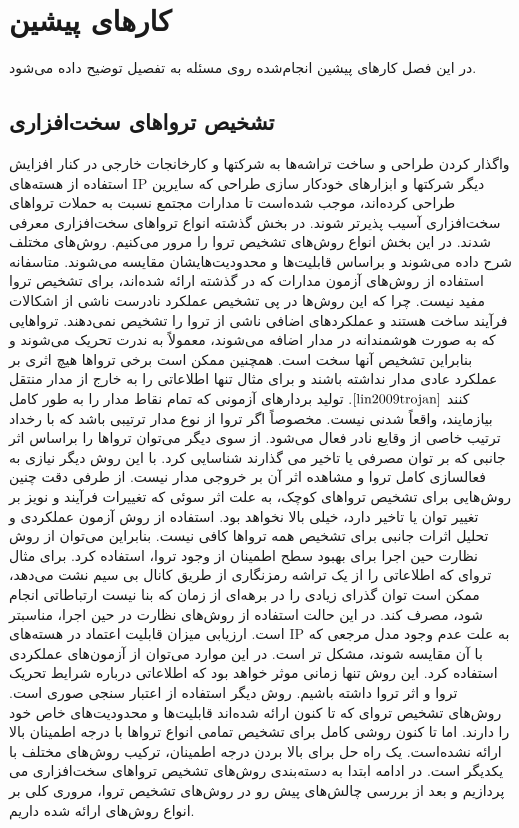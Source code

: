 \chapter{کارهای پیشین}
در این فصل کارهای پیشین انجام‌شده روی مسئله به تفصیل توضیح داده می‌شود.
\section{تشخیص تروا‌های سخت‌افزاری}
واگذار کردن طراحی و ساخت تراشه‌ها به شرکتها و کارخانجات خارجی در کنار افزایش استفاده از هسته‌های IP دیگر شرکتها و ابزارهای خودکار سازی طراحی که سایرین طراحی کرده‌اند، موجب شده‌است تا مدارات مجتمع نسبت به حملات تروا‌های سخت‌افزاری آسیب پذیرتر شوند. در بخش گذشته انواع تروا‌های سخت‌افزاری معرفی شدند. در این بخش انواع روش‌های تشخیص تروا را مرور می‌کنیم. روش‌های مختلف شرح داده می‌شوند و براساس قابلیت‌ها و محدودیت‌هایشان مقایسه می‌شوند. متاسفانه استفاده از روش‌های آزمون مدارات که در گذشته ارائه شده‌اند، برای تشخیص تروا مفید نیست. چرا که این روش‌ها در پی تشخیص عملکرد نادرست ناشی از اشکالات فرآیند ساخت هستند و عملکردهای اضافی ناشی از تروا را تشخیص نمی‌دهند. تروا‌هایی که به صورت هوشمندانه در مدار اضافه می‌شوند، معمولاً به ندرت تحریک می‌شوند و بنابراین تشخیص آنها سخت است. همچنین ممکن است برخی تروا‌ها هیچ اثری بر عملکرد عادی مدار نداشته باشند و برای مثال تنها اطلاعاتی را به خارج از مدار منتقل کنند
$\cite{lin2009trojan}$. 
تولید بردارهای آزمونی که تمام نقاط مدار را به طور کامل بیازمایند، واقعاً شدنی نیست. مخصوصاً اگر تروا از نوع مدار ترتیبی باشد که با رخداد ترتیب خاصی از وقایع نادر فعال می‌شود. از سوی دیگر می‌توان تروا‌ها را براساس اثر جانبی که بر توان مصرفی یا تاخیر می گذارند شناسایی کرد. با این روش دیگر نیازی به فعالسازی کامل تروا و مشاهده اثر آن بر خروجی مدار نیست. از طرفی دقت چنین روش‌هایی برای تشخیص تروا‌های کوچک، به علت اثر سوئی که تغییرات فرآیند و نویز بر تغییر توان یا تاخیر دارد، خیلی بالا نخواهد بود. 
استفاده از روش آزمون عملکردی و تحلیل اثرات جانبی برای تشخیص همه تروا‌ها کافی نیست. بنابراین می‌توان از روش نظارت حین اجرا برای بهبود سطح اطمینان از وجود تروا، استفاده کرد. برای مثال تروای که اطلاعاتی را از یک تراشه رمزنگاری از طریق کانال بی سیم نشت می‌دهد، ممکن است توان گذرای زیادی را در برهه‌ای از زمان که بنا نیست ارتباطاتی انجام شود، مصرف کند. در این حالت استفاده از روش‌های نظارت در حین اجرا، مناسبتر است.
ارزیابی میزان قابلیت اعتماد در هسته‌های IP به علت عدم وجود مدل مرجعی که با آن مقایسه شوند، مشکل تر است. در این موارد می‌توان از آزمون‌های عملکردی استفاده کرد. این روش تنها زمانی موثر خواهد بود که اطلاعاتی درباره شرایط تحریک تروا و اثر تروا داشته باشیم. روش دیگر استفاده از اعتبار سنجی صوری است. 
روش‌های تشخیص تروای که تا کنون ارائه شده‌اند قابلیت‌ها و محدودیت‌های خاص خود را دارند. اما تا کنون روشی کامل برای تشخیص تمامی انواع تروا‌ها با درجه اطمینان بالا ارائه نشده‌است. یک راه حل برای بالا بردن درجه اطمینان، ترکیب روش‌های مختلف با یکدیگر است. در ادامه ابتدا به دسته‌بندی روش‌های تشخیص تروا‌های سخت‌افزاری می پردازیم و بعد از بررسی چالش‌های پیش رو در روش‌های تشخیص تروا، مروری کلی بر انواع روش‌های ارائه شده داریم.

